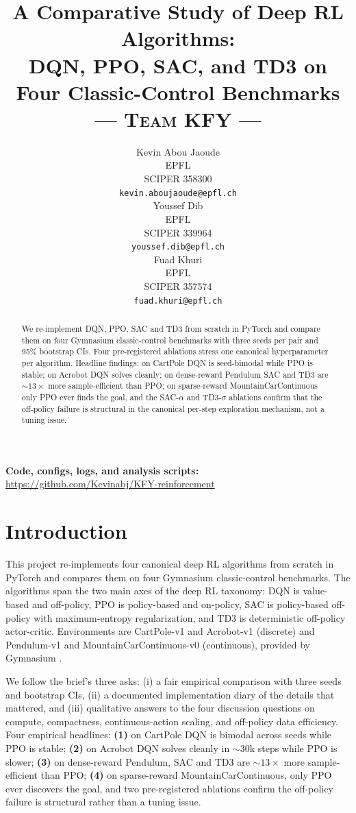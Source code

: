 \documentclass{article}
\title{A Comparative Study of Deep RL Algorithms: \\ DQN, PPO, SAC, and TD3 on Four Classic-Control Benchmarks \\[0.45em] {\normalsize\textsc{\textmd{--- Team \textbf{KFY} ---}}}}
\author{%
  Kevin Abou Jaoude \\
  EPFL \\
  SCIPER 358300 \\
  \texttt{kevin.aboujaoude@epfl.ch} \\
  \And
  Youssef Dib \\
  EPFL \\
  SCIPER 339964 \\
  \texttt{youssef.dib@epfl.ch} \\
  \And
  Fuad Khuri \\
  EPFL \\
  SCIPER 357574 \\
  \texttt{fuad.khuri@epfl.ch} \\
}
\begin{document}
\maketitle

\begin{abstract}
We re-implement DQN, PPO, SAC and TD3 from scratch in PyTorch and compare them on four Gymnasium classic-control benchmarks with three seeds per pair and 95\% bootstrap CIs. Four pre-registered ablations stress one canonical hyperparameter per algorithm. Headline findings: on CartPole DQN is seed-bimodal while PPO is stable; on Acrobot DQN solves cleanly; on dense-reward Pendulum SAC and TD3 are ${\sim}13\times$ more sample-efficient than PPO; on sparse-reward MountainCarContinuous only PPO ever finds the goal, and the SAC-$\alpha$ and TD3-$\sigma$ ablations confirm that the off-policy failure is structural in the canonical per-step exploration mechanism, not a tuning issue.
\end{abstract}

\begin{center}
\textbf{Code, configs, logs, and analysis scripts:} \url{https://github.com/Kevinabj/KFY-reinforcement}
\end{center}


\section{Introduction}
\label{sec:intro}

This project re-implements four canonical deep RL algorithms from scratch in PyTorch and compares them on four Gymnasium classic-control benchmarks. The algorithms span the two main axes of the deep RL taxonomy: DQN \cite{mnih2013playing} is value-based and off-policy, PPO \cite{schulman2017proximal} is policy-based and on-policy, SAC \cite{haarnoja2018soft} is policy-based off-policy with maximum-entropy regularization, and TD3 \cite{fujimoto2018addressing} is deterministic off-policy actor-critic. Environments are CartPole-v1 and Acrobot-v1 (discrete) and Pendulum-v1 and MountainCarContinuous-v0 (continuous), provided by Gymnasium \cite{towers2023gymnasium}.

We follow the brief's three asks: (i) a fair empirical comparison with three seeds and bootstrap CIs, (ii) a documented implementation diary of the details that mattered, and (iii) qualitative answers to the four discussion questions on compute, compactness, continuous-action scaling, and off-policy data efficiency. Four empirical headlines: \textbf{(1)} on CartPole DQN is bimodal across seeds while PPO is stable; \textbf{(2)} on Acrobot DQN solves cleanly in $\sim$30k steps while PPO is slower; \textbf{(3)} on dense-reward Pendulum, SAC and TD3 are $\sim 13\times$ more sample-efficient than PPO; \textbf{(4)} on sparse-reward MountainCarContinuous, only PPO ever discovers the goal, and two pre-registered ablations confirm the off-policy failure is structural rather than a tuning issue.
\end{document}
